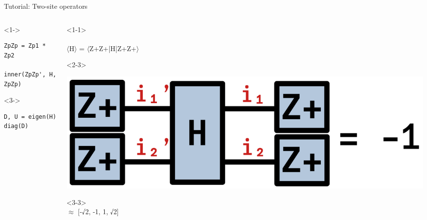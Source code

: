 \begin{frame}[fragile]{Tutorial: Two-site operators}

\begin{columns}

\begin{column}{5cm}

\begin{onlyenv}<1->
\begin{lstlisting}[language=JuliaLocal, style=julia, basicstyle=\small]
ZpZp = Zp1 * Zp2

inner(ZpZp', H, ZpZp)
\end{lstlisting}
\end{onlyenv}

\begin{onlyenv}<3->
\begin{lstlisting}[language=JuliaLocal, style=julia, basicstyle=\small]
D, U = eigen(H)
diag(D)
\end{lstlisting}
\end{onlyenv}

\end{column}

\begin{column}{5cm}

\begin{onlyenv}<1-1>
~\\
~\\
$\langle$H$\rangle$ = $\langle$Z+Z+|H|Z+Z+$\rangle$ \\
\end{onlyenv}

\begin{onlyenv}<2-3>
\vspace*{0.0cm}
\begin{center}
\includegraphics[width=1.0\textwidth]{
  slides/assets/Zp1Zp2HZp1Zp2.png
}
\end{center}
\vspace*{0.0cm}
\end{onlyenv}

\begin{onlyenv}<3-3>
~\\
$\approx$ [-√2, -1, 1, √2]
\end{onlyenv}


\end{column}
\end{columns}
\end{frame}
